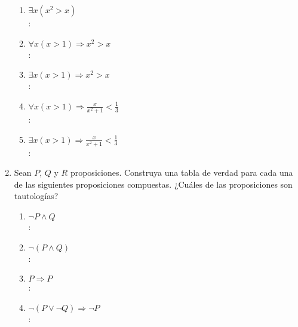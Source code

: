 \begin{enumerate}[label=0.1.\arabic*]
\begin{enumerate}[label=\arabic*)]
		\item $ \exists x (x^2 > x) $ \\
		\solucion: \\
		
		\item $ \forall x (x > 1) \Rightarrow x^2 > x $ \\
		\solucion: \\
		
		\item $ \exists x (x > 1) \Rightarrow x^2 > x $ \\
		\solucion: \\
		
		\item $ \forall x (x > 1) \Rightarrow \frac{x}{x^2 + 1} < \frac{1}{3} $ \\
		\solucion: \\
		
		\item $ \exists x (x > 1) \Rightarrow \frac{x}{x^2 + 1} < \frac{1}{3} $ \\
		\solucion: \\
		
	\end{enumerate}

	\item Sean $ P $, $ Q $ y $ R $ proposiciones. Construya una tabla de verdad para cada una de las siguientes proposiciones compuestas. ¿Cuáles de las proposiciones son tautologías?
	\begin{enumerate}[label=\arabic*)]
		\item $ \neg P \wedge Q $ \\
		\solucion: \\
		
		\item $ \neg (P \wedge Q) $ \\
		\solucion: \\
		
		\item $ P \Rightarrow P $ \\
		\solucion: \\
		
		\item $ \neg (P \vee \neg Q) \Rightarrow \neg P $ \\
		\solucion: \\
		

\end{enumerate}
\end{enumerate}

